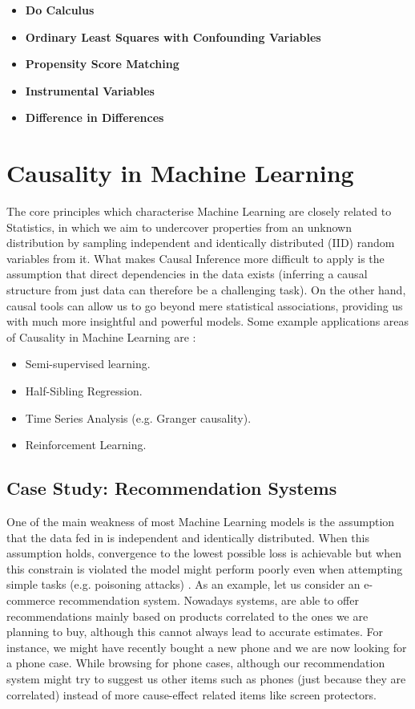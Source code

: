 \begin{itemize}
    \item \textbf{Do Calculus}
    \item \textbf{Ordinary Least Squares with Confounding Variables}
    \item \textbf{Propensity Score Matching}
    \item \textbf{Instrumental Variables}
    \item \textbf{Difference in Differences}
\end{itemize}

\section{Causality in Machine Learning}

The core principles which characterise Machine Learning are closely related to Statistics, in which we aim to undercover properties from an unknown distribution by sampling independent and identically distributed (IID) random variables from it. What makes Causal Inference more difficult to apply is the assumption that direct dependencies in the data exists (inferring a causal structure from just data can therefore be a challenging task). On the other hand, causal tools can allow us to go beyond mere statistical associations, providing us with much more insightful and powerful models. Some example applications areas of Causality in Machine Learning are \cite{ml_peters}:
\begin{itemize}
    \item Semi-supervised learning.
    \item Half-Sibling Regression.
    \item Time Series Analysis (e.g. Granger causality).
    \item Reinforcement Learning.
\end{itemize}

\subsection{Case Study: Recommendation Systems}

One of the main weakness of most Machine Learning models is the assumption that the data fed in is independent and identically distributed. When this assumption holds, convergence to the lowest possible loss is achievable but when this constrain is violated the model might perform poorly even when attempting simple tasks (e.g. poisoning attacks) \cite{six}.
As an example, let us consider an e-commerce recommendation system. Nowadays systems, are able to offer recommendations mainly based on products correlated to the ones we are planning to buy, although this cannot always lead to accurate estimates. For instance, we might have recently bought a new phone and we are now looking for a phone case. While browsing for phone cases, although our recommendation system might try to suggest us other items such as phones (just because they are correlated) instead of more cause-effect related items like screen protectors.